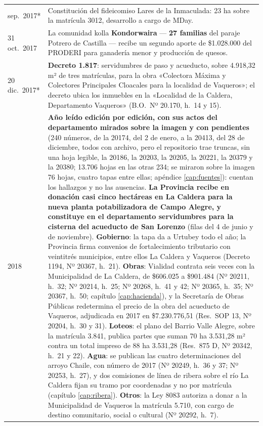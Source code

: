 \begin{longtable}{@{}p{2.7cm}p{10.3cm}@{}}
sep.\ 2017* & Constitución del fideicomiso Lares de la Inmaculada: 23 ha sobre la matrícula 3012, desarrollo a cargo de MDay. \\
31 oct.\ 2017 & La comunidad kolla \textbf{Kondorwaira} --- \textbf{27 familias} del paraje Potrero de Castilla --- recibe un segundo aporte de \$1.028.000 del PRODERI para ganadería menor y producción de quesos. \\
20 dic.\ 2017* & \textbf{Decreto 1.817}: servidumbres de paso y acueducto, sobre 4.918,32 m² de tres matrículas, para la obra «Colectora Máxima y Colectores Principales Cloacales para la localidad de Vaqueros»; el decreto ubica los inmuebles en la «Localidad de la Caldera, Departamento Vaqueros» (B.O.\ Nº 20.170, h.\ 14 y 15). \\
2018 & \textbf{Año leído edición por edición, con sus actos del departamento mirados sobre la imagen y con pendientes} (240 números, de la 20174, del 2 de enero, a la 20413, del 28 de diciembre, todos con archivo, pero el repositorio trae truncas, sin una hoja legible, la 20186, la 20203, la 20205, la 20221, la 20379 y la 20380; 13.706 hojas en las otras 234; se miraron sobre la imagen 76 hojas, cuatro tapas entre ellas; apéndice \ref{cap:fuentes}): cuentan los hallazgos y no las ausencias. \textbf{La Provincia recibe en donación casi cinco hectáreas en La Caldera para la nueva planta potabilizadora de Campo Alegre, y constituye en el departamento servidumbres para la cisterna del acueducto de San Lorenzo} (filas del 4 de junio y de noviembre). \textbf{Gobierno}: la tapa da a Urtubey todo el año; la Provincia firma convenios de fortalecimiento tributario con veintitrés municipios, entre ellos La Caldera y Vaqueros (Decreto 1194, Nº 20367, h.\ 21). \textbf{Obras}: Vialidad contrata seis veces con la Municipalidad de La Caldera, de \$606.025 a \$901.484 (Nº 20211, h.\ 32; Nº 20214, h.\ 25; Nº 20268, h.\ 41 y 42; Nº 20365, h.\ 35; Nº 20367, h.\ 50; capítulo \ref{cap:hacienda}), y la Secretaría de Obras Públicas redetermina el precio de la obra del acueducto de Vaqueros, adjudicada en 2017 en \$7.230.776,51 (Res.\ SOP 13, Nº 20204, h.\ 30 y 31). \textbf{Loteos}: el plano del Barrio Valle Alegre, sobre la matrícula 3.841, publica partes que suman 70 ha 3.531,28 m² contra un total impreso de 88 ha 3.531,28 (Res.\ 875 D, Nº 20342, h.\ 21 y 22). \textbf{Agua}: se publican las cuatro determinaciones del arroyo Chaile, con número de 2017 (Nº 20249, h.\ 36 y 37; Nº 20253, h.\ 27), y dos comisiones de línea de ribera sobre el río La Caldera fijan su tramo por coordenadas y no por matrícula (capítulo \ref{cap:ribera}). \textbf{Otros}: la Ley 8083 autoriza a donar a la Municipalidad de Vaqueros la matrícula 5.710, con cargo de destino comunitario, social o cultural (Nº 20292, h.\ 7). \\

\end{longtable}
